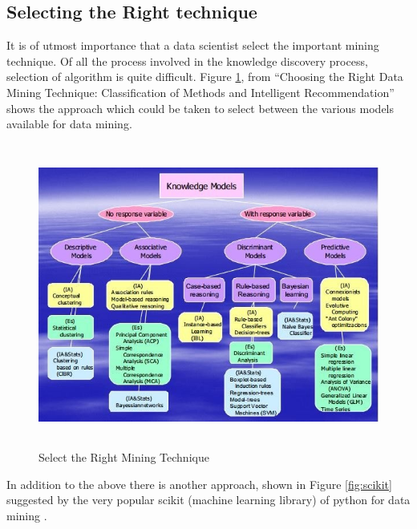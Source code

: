 \newpage
\subsection{Selecting the Right technique}
It is of utmost importance that a data scientist select the important mining  technique. Of all the process involved in the knowledge discovery process, selection of algorithm is quite difficult. Figure \ref{fig:selectdatamining},  from ``Choosing the Right Data Mining Technique: Classification of Methods and Intelligent Recommendation''   shows the approach which could be taken to select between the various models available for data mining.

\begin{figure}[H]
	\includegraphics[width=\columnwidth,height=10cm]{figures/selectionofdatamining.jpeg}
	\centering
	\caption{Select the Right Mining Technique }
	\label{fig:selectdatamining}
\end{figure}

In addition to the above there is another approach, shown in Figure \ref{fig:scikit} suggested by the very popular scikit (machine learning library) of python for data mining .

